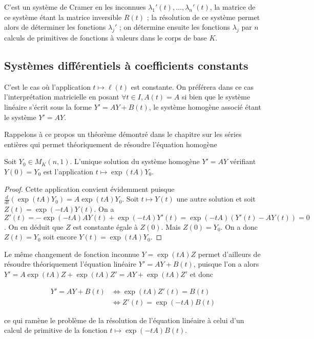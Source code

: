 C'est un système de Cramer en les inconnues
$\lambda_1'(t),\ldots,\lambda_n'(t)$, la matrice de ce système étant la matrice inversible $R(t)$ ; la
résolution de ce système permet alors de déterminer les fonctions
$\lambda_j'$ ; on détermine ensuite les fonctions $\lambda_j$ par $n$
calculs de primitives de fonctions à valeurs dans le corps de base $K$.

\subsection{Systèmes différentiels à coefficients constants}

C'est le cas où l'application $t \mapsto \ell(t)$ est
constante. On préférera dans ce cas l'interprétation matricielle en
posant $\forall t \in I, A(t) = A$ si bien que le système
linéaire s'écrit sous la forme $Y' = AY + B(t)$, le système homogène
associé étant le système $Y' = AY$.

Rappelons à ce propos un théorème démontré dans le chapitre sur les
séries entières qui permet théoriquement de résoudre l'équation homogène

\begin{thm}
Soit $Y_0 \in M_K(n,1)$. L'unique
solution du système homogène $Y' = AY$ vérifiant $Y(0) = Y_0$
est l'application
$t \mapsto \exp(tA)Y_0$.
\end{thm}

\begin{proof}
Cette application convient évidemment puisque $\frac{d}{dt}(\exp(tA)Y_0) = A\exp(tA)Y_0$. Soit
$t \mapsto Y(t)$ une autre solution et soit $Z(t) = \exp(-tA)Y(t)$. On a $Z'(t) = -\exp(-tA)AY(t) + \exp(-tA)Y'(t) = \exp(-tA)(Y'(t) - AY(t)) = 0$. On en déduit que $Z$ est constante égale à $Z(0)$. Mais $Z(0) = Y_0$. On a donc $Z(t) = Y_0$ soit encore $Y(t) = \exp(tA)Y_0$.
\end{proof}

\begin{rem}
Le même changement de fonction inconnue $Y = \exp(tA)Z$ permet d'ailleurs de résoudre
théoriquement l'équation linéaire $Y' = AY + B(t)$, puisque l'on a alors
$Y' = A\exp(tA)Z + \exp(tA)Z' = AY + \exp(tA)Z'$ et donc

\begin{align*} 
Y' = AY + B(t) &\Leftrightarrow \exp(tA)Z'(t) = B(t) \\
&\Leftrightarrow Z'(t) = \exp(-tA)B(t)
\end{align*}

ce qui ramène le problème de la résolution de l'équation linéaire à
celui d'un calcul de primitive de la fonction
$t \mapsto \exp(-tA)B(t)$.
\end{rem}


